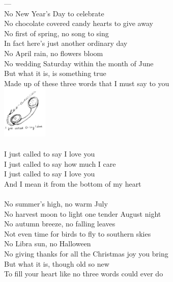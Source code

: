 \documentclass[a5paper, 10pt]{book}
\begin{document}
\begin{minipage}[t]{0.75\textwidth}
---\\

No New Year's Day to celebrate 					\\
No chocolate covered candy hearts to give away 			\\
No first of spring, no song to sing 				\\
In fact here's just another ordinary day\\
No April rain, no flowers bloom\\
No wedding Saturday within the month of June\\
But what it is, is something true\\
Made up of these three words that I must say to you\\
\hspace*{7.4cm}\includegraphics[height=2.5cm]{images/stand_by_me.png}\vspace*{-2.6cm}\\
\\
\hspace*{5mm}I just called to say I love you 		\\
\hspace*{5mm}I just called to say how much I care\\
\hspace*{5mm}I just called to say I love you 		\\
\hspace*{5mm}And I mean it from the bottom of my heart\\
\\
No summer's high, no warm July 				\\
No harvest moon to light one tender August night 		\\
No autumn breeze, no falling leaves 			\\
Not even time for birds to fly to southern skies\\
No Libra sun, no Halloween\\
No giving thanks for all the Christmas joy you bring\\
But what it is, though old so new\\
To fill your heart like no three words could ever do\\
\end{minipage}
\end{document}
